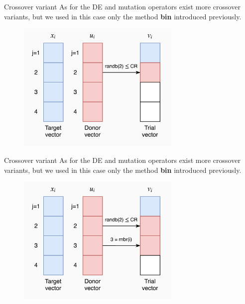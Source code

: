 \documentclass[xcolor={usenames}]{beamer}
\begin{document}
  \begin{frame}{Crossover variant}
	As for the DE and mutation operators exist more crossover variants, but we used in this case only the method \textbf{bin} introduced previously.
	\begin{figure}
		\centering
		\includegraphics[width=0.7\textwidth]{../figures/bin-2.png}
	\end{figure}
  \end{frame}
  
  \begin{frame}{Crossover variant}
	As for the DE and mutation operators exist more crossover variants, but we used in this case only the method \textbf{bin} introduced previously.
	\begin{figure}
		\centering
		\includegraphics[width=0.7\textwidth]{../figures/bin-3.png}
	\end{figure}
  \end{frame}
  
\end{document}
